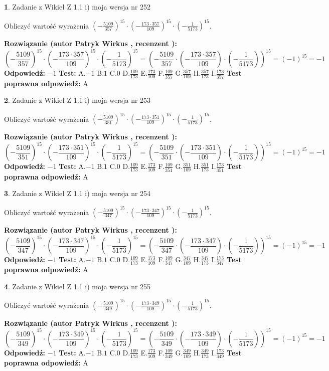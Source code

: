 \documentclass[12pt, a4paper]{article}
\theoremstyle{definition} %
\newtheorem{zad}{}
\newcommand{\zadStart}[1]{\begin{zad}#1\newline}
\newcommand{\zadStop}{\end{zad}}
\newcommand{\rozwStart}[2]{\noindent \textbf{Rozwiązanie (autor #1 , recenzent #2): }\newline}
\newcommand{\rozwStop}{\newline}
\newcommand{\odpStart}{\noindent \textbf{Odpowiedź:}\newline}
\newcommand{\odpStop}{\newline}
\newcommand{\testStart}{\noindent \textbf{Test:}\newline}
\newcommand{\testStop}{\newline}
\newcommand{\kluczStart}{\noindent \textbf{Test poprawna odpowiedź:}\newline}
\newcommand{\kluczStop}{\newline}
\begin{document}
\zadStart{Zadanie z Wikieł Z 1.1 i) moja wersja nr 252}

Obliczyć wartość wyrażenia $(-\frac{5109}{357})^{15} \cdot (-\frac{173 \cdot 357}{109})^{15} \cdot (-\frac{1}{5173})^{15}$.
\zadStop
\rozwStart{Patryk Wirkus}{}
$$(-\frac{5109}{357})^{15} \cdot (-\frac{173 \cdot 357}{109})^{15} \cdot (-\frac{1}{5173})^{15} = (-\frac{5109}{357} \cdot (-\frac{173 \cdot 357}{109}) \cdot (-\frac{1}{5173}))^{15} = (-1)^{15} = -1$$
\rozwStop
\odpStart
$-1$
\odpStop
\testStart
A.$-1$ B.$1$ C.$0$ D.$\frac{109}{173}$ E.$\frac{173}{109}$
F.$\frac{109}{357}$ G.$\frac{357}{109}$
H.$\frac{357}{173}$
I.$\frac{173}{357}$
\testStop
\kluczStart
A
\kluczStop



\zadStart{Zadanie z Wikieł Z 1.1 i) moja wersja nr 253}

Obliczyć wartość wyrażenia $(-\frac{5109}{351})^{15} \cdot (-\frac{173 \cdot 351}{109})^{15} \cdot (-\frac{1}{5173})^{15}$.
\zadStop
\rozwStart{Patryk Wirkus}{}
$$(-\frac{5109}{351})^{15} \cdot (-\frac{173 \cdot 351}{109})^{15} \cdot (-\frac{1}{5173})^{15} = (-\frac{5109}{351} \cdot (-\frac{173 \cdot 351}{109}) \cdot (-\frac{1}{5173}))^{15} = (-1)^{15} = -1$$
\rozwStop
\odpStart
$-1$
\odpStop
\testStart
A.$-1$ B.$1$ C.$0$ D.$\frac{109}{173}$ E.$\frac{173}{109}$
F.$\frac{109}{351}$ G.$\frac{351}{109}$
H.$\frac{351}{173}$
I.$\frac{173}{351}$
\testStop
\kluczStart
A
\kluczStop



\zadStart{Zadanie z Wikieł Z 1.1 i) moja wersja nr 254}

Obliczyć wartość wyrażenia $(-\frac{5109}{347})^{15} \cdot (-\frac{173 \cdot 347}{109})^{15} \cdot (-\frac{1}{5173})^{15}$.
\zadStop
\rozwStart{Patryk Wirkus}{}
$$(-\frac{5109}{347})^{15} \cdot (-\frac{173 \cdot 347}{109})^{15} \cdot (-\frac{1}{5173})^{15} = (-\frac{5109}{347} \cdot (-\frac{173 \cdot 347}{109}) \cdot (-\frac{1}{5173}))^{15} = (-1)^{15} = -1$$
\rozwStop
\odpStart
$-1$
\odpStop
\testStart
A.$-1$ B.$1$ C.$0$ D.$\frac{109}{173}$ E.$\frac{173}{109}$
F.$\frac{109}{347}$ G.$\frac{347}{109}$
H.$\frac{347}{173}$
I.$\frac{173}{347}$
\testStop
\kluczStart
A
\kluczStop



\zadStart{Zadanie z Wikieł Z 1.1 i) moja wersja nr 255}

Obliczyć wartość wyrażenia $(-\frac{5109}{349})^{15} \cdot (-\frac{173 \cdot 349}{109})^{15} \cdot (-\frac{1}{5173})^{15}$.
\zadStop
\rozwStart{Patryk Wirkus}{}
$$(-\frac{5109}{349})^{15} \cdot (-\frac{173 \cdot 349}{109})^{15} \cdot (-\frac{1}{5173})^{15} = (-\frac{5109}{349} \cdot (-\frac{173 \cdot 349}{109}) \cdot (-\frac{1}{5173}))^{15} = (-1)^{15} = -1$$
\rozwStop
\odpStart
$-1$
\odpStop
\testStart
A.$-1$ B.$1$ C.$0$ D.$\frac{109}{173}$ E.$\frac{173}{109}$
F.$\frac{109}{349}$ G.$\frac{349}{109}$
H.$\frac{349}{173}$
I.$\frac{173}{349}$
\testStop
\kluczStart
A
\kluczStop
\end{document}
